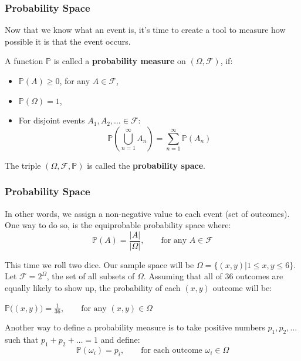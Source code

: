 \documentclass{beamer}
\newcommand{\PP}{\mathbb{P}}
\newcommand{\F}{\mathcal{F}}
\begin{document}

\begin{frame}
    \frametitle{Probability Space}
    Now that we know what an event is, it's time to create a tool to measure how possible it is that the event occurs.
    \pause
    \begin{definition}
    A function $\PP$ is called a \textbf{probability measure} on $(\Omega, \mathcal{F})$, if:
    \begin{itemize}[<+->]
        \item $\PP(A) \ge 0$, for any $A\in\mathcal{F}$,
        \item $\PP(\Omega) = 1$,
        \item For disjoint events $A_1, A_2, \dots \in \mathcal{F}$: 
        $$\PP\left(\bigcup_{n=1}^\infty A_n\right) = \sum_{n=1}^\infty \PP(A_n)$$
    \end{itemize}
    
    \end{definition}

    \pause
    \begin{definition}
    The triple $(\Omega, \mathcal{F}, \PP)$ is called the \textbf{probability space}.
    \end{definition}
    
    
\end{frame}


\begin{frame}
    \frametitle{Probability Space}
    In other words, we assign a non-negative value to each event (set of outcomes). \pause One way to do so, is the equiprobable probability space where:
    \[\PP(A) =\dfrac{|A|}{|\Omega|}, \qquad \text{for any }A\in\F \]
    \pause\begin{example}
        This time we roll two dice. Our sample space will be $\Omega = \{(x,y)\vert 1 \le x,y \le 6\}$. Let $\mathcal{F}=2^\Omega$, the set of all subsets of $\Omega$.
        \pause
        Assuming that all of 36 outcomes are equally likely to show up, the probability of each $(x,y)$ outcome will be:\\
        \begin{center}
            $\PP\big((x,y)\big) = \frac{1}{36}, \qquad \text{for any } (x,y)\in\Omega$
        \end{center}
    \end{example}    
    \pause Another way to define a probability measure is to take positive numbers $p_1,p_2,\dots$ such that $p_1+p_2+\dots=1$ and define:
    \[\PP(\omega_i)=p_i, \qquad \text{for each outcome }\omega_i\in\Omega \]
\end{frame}
\end{document}

